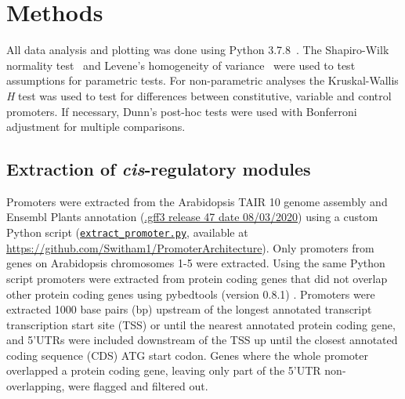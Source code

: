 \documentclass[../main.tex]{subfiles}
\begin{document}
\section{Methods}
\label{chapter1:methods}
All data analysis and plotting was done using Python 3.7.8~\autocite{pythoncoreteamPythonDynamicOpen2020}.
The Shapiro\hyp{}Wilk normality test~\autocite{shapiroAnalysisVarianceTest1965} and Levene's homogeneity of variance~\autocite{leveneRobustTestsEquality1960} were used to test assumptions for parametric tests.
For non\hyp{}parametric analyses the Kruskal\hyp{}Wallis \textit{H} test \autocite{kruskalUseRanksOneCriterion1952} was used to test for differences between constitutive, variable and control promoters.
If necessary, Dunn's post\hyp{}hoc tests \autocite{dunnMultipleComparisonsUsing1964} were used with Bonferroni adjustment for multiple comparisons.

\subsection{Extraction of \textit{cis}-regulatory modules}\label{chapter1:methods:extraction-of-cis-regulatory-modules}

Promoters were extracted from the Arabidopsis TAIR 10 \autocite{lameschArabidopsisInformationResource2012} genome assembly and Ensembl Plants \autocite{howeEnsemblGenomes20202020} annotation (\href{ftp://ftp.ensemblgenomes.org/pub/release-47/plants/gff3/arabidopsis_thaliana/}{.gff3 release 47 date 08/03/2020}) using a custom Python script (\href{https://github.com/Switham1/PromoterArchitecture/blob/master/src/data_sorting/extract_promoter.py}{\texttt{extract\_promoter.py}}, available at \url{https://github.com/Switham1/PromoterArchitecture}).
Only promoters from genes on Arabidopsis chromosomes 1-5 were extracted.
Using the same Python script promoters were extracted from protein coding genes that did not overlap other protein coding genes using pybedtools (version 0.8.1) \autocite{dalePybedtoolsFlexiblePython2011}.
Promoters were extracted 1000 base pairs (bp) upstream of the longest annotated transcript transcription start site (TSS) or until the nearest annotated protein coding gene, and 5'UTRs were included downstream of the TSS up until the closest annotated coding sequence (CDS) ATG start codon.
Genes where the whole promoter overlapped a protein coding gene, leaving only part of the 5'UTR non-overlapping, were flagged and filtered out.
\end{document}
